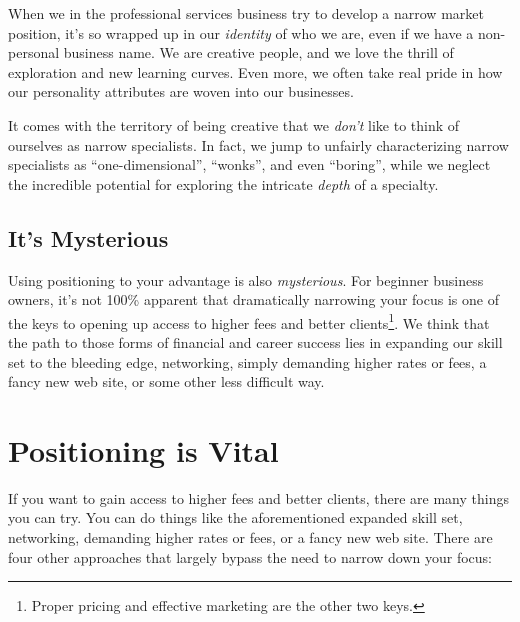 When we in the professional services business try to develop a narrow market position, it's so wrapped up in our \emph{identity} of who we are, even if we have a non-personal business name. We are creative people, and we love the thrill of exploration and new learning curves. Even more, we often take real pride in how our personality attributes are woven into our businesses.

It comes with the territory of being creative that we \emph{don't} like to think of ourselves as narrow specialists. In fact, we jump to unfairly characterizing narrow specialists as ``one-dimensional'', ``wonks'', and even ``boring'', while we neglect the incredible potential for exploring the intricate \emph{depth} of a specialty.

\subsection{It's Mysterious}

Using positioning to your advantage is also \emph{mysterious}. For beginner business owners, it's not 100\% apparent that dramatically narrowing your focus is one of the keys to opening up access to higher fees and better clients\footnote{Proper pricing and effective marketing are the other two keys.}. We think that the path to those forms of financial and career success lies in expanding our skill set to the bleeding edge, networking, simply demanding higher rates or fees, a fancy new web site, or some other less difficult way.

\section{Positioning is Vital}

If you want to gain access to higher fees and better clients, there are many things you can try. You can do things like the aforementioned expanded skill set, networking, demanding higher rates or fees, or a fancy new web site. There are four other approaches that largely bypass the need to narrow down your focus:

